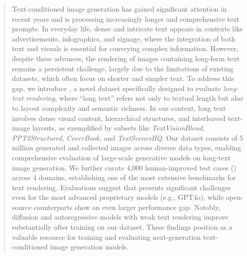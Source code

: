 \begin{abstract}
Text-conditioned image generation has gained significant attention in recent years and is processing increasingly longer and comprehensive text prompts. 
In everyday life, dense and intricate text appears in contexts like advertisements, infographics, and signage, where the integration of both text and visuals is essential for conveying complex information. 
However, despite these advances, the rendering of images containing long-form text remains a persistent challenge, largely due to the limitations of existing datasets, which often focus on shorter and simpler text. 
To address this gap, we introduce \DatasetName, a novel dataset specifically designed to evaluate \emph{long-text rendering}, where ``long text'' refers not only to textual length but also to layout complexity and semantic richness. 
In our context, long text involves dense visual content, hierarchical structures, and interleaved text-image layouts, as exemplified by subsets like \textit{TextVisionBlend}, \textit{PPT2Structured}, \textit{CoverBook}, and \textit{TextScenesHQ}. 
Our dataset consists of 5 million generated and collected images across diverse data types, enabling comprehensive evaluation of large-scale generative models on long-text image generation. 
We further curate 4,000 human-improved test cases (\EvalDatasetName) across 4 domains, establishing one of the most extensive benchmarks for text rendering. 
Evaluations suggest that \EvalDatasetName presents significant challenges even for the most advanced proprietary models (e.g., GPT4o), while open-source counterparts show an even larger performance gap. 
Notably, diffusion and autoregressive models with weak text rendering improve substantially after training on our dataset.
These findings position \DatasetName as a valuable resource for training and evaluating next-generation text-conditioned image generation models. 
\end{abstract}

